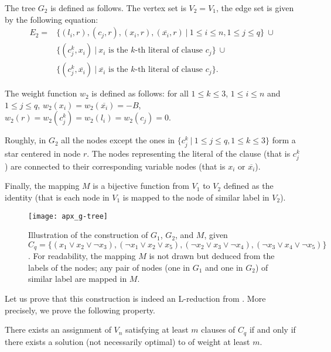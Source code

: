 		The tree $G_2$ is defined as follows. The vertex set is $V_2=V_1$, the edge set is given by the following equation:
		\begin{align*}
		E_2= & \{(l_i,r), (c_j,r), (x_i,r), (\overline{x_i},r) ~\vert~ 1\leq i\leq n, 1\leq j \leq q\} ~\cup \\
		& \{(c^k_j,x_i) ~\vert~ x_i \text{ is the  } k\text{-th literal of clause } c_j\} ~\cup\\
		& \{(c^k_j,\overline{x_i}) ~\vert~ \overline{x_i} \text{ is the } k\text{-th literal of clause } c_j\}.
		\end{align*}

		The weight function $w_2$ is defined as follows: for all $1\leq k \leq 3$, $1\leq i\leq n$ and $1\leq j \leq q$, $w_2(x_i)=w_2(\overline{x_i})=-B$, $w_2(r)=w_2(c_j^k)=w_2(l_i)=w_2(c_j)=0$.


		Roughly, in $G_2$ all the nodes except the ones in $\{c_j^k~\vert~ 1\leq j \leq q, 1\leq k\leq 3\}$ form a star centered in node $r$. The nodes representing the literal of the clause (that is $c_j^k$) are connected to their corresponding variable nodes (that is $x_i$ or $\overline{x_i}$).

		Finally, the mapping $M$ is a bijective function from $V_1$ to $V_2$ defined as the identity (that is each node in $V_1$ is mapped to the node of similar label in $V_2$).


		\begin{figure}[ht]
    	 	 
    	 	 \centering
    	 	 \texttt{[image: apx\_g-tree]}
    	 	 \caption{Illustration of the construction of $G_1$, $G_2$, and $M$, given $C_q = \{(x_1 \vee x_2 \vee \neg{}x_3), (\neg{}x_1 \vee x_2 \vee x_5), (\neg{}x_2 \vee x_3 \vee \neg{}x_4), (\neg{}x_3 \vee x_4 \vee \neg{}x_5)\}$. For readability, the mapping $M$ is not drawn but deduced from the labels of the nodes; any pair of nodes (one in $G_1$ and one in $G_2$) of similar label are mapped in $M$.}\label{fig:g-tree}
    	 	 \end{figure}
   		
		Let us prove that this construction is indeed an L-reduction from \msat{}. More precisely, we prove the following property.

		\begin{lemma}
 	 	 There exists an assignment of $V_n$ satisfying at least $m$ clauses of $C_q$ if and only if there exists a solution (not necessarily optimal) to \mwccs{} of weight at least $m$.
		\end{lemma}


